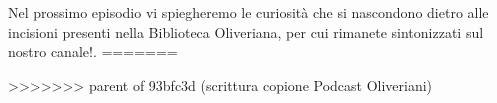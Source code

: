 \documentclass[hidelinks,12pt,a4paper]{article}
\begin{document}
\begin{flushleft}
		      Nel prossimo episodio vi spiegheremo le curiosità che si nascondono dietro alle incisioni presenti nella Biblioteca Oliveriana, per cui rimanete sintonizzati sul nostro canale!.
=======
		\maketitle
		
>>>>>>> parent of 93bfc3d (scrittura copione Podcast Oliveriani)
		\setcounter{page}{1}
		\newpage
		
		\tableofcontents
		\newpage
		
		
		
		\vspace*{\fill}
		\doclicenseThis
	\end{flushleft}
\end{document}
